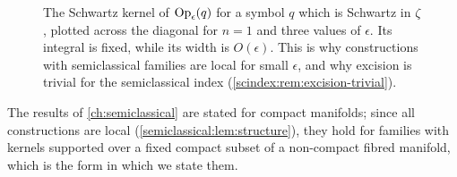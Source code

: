 \begin{figure}[ht]
\centering
{}
\caption[Concentration of semiclassical kernels]{The Schwartz kernel of
$\operatorname{Op}_\epsilon(q)$ for a symbol $q$ which is Schwartz in $\zeta$, plotted across the
diagonal for $n=1$ and three values of $\epsilon$. Its integral is fixed, while its
width is $O(\epsilon)$. This is why constructions with semiclassical families are
local for small $\epsilon$, and why excision is trivial for the semiclassical
index (\cref{scindex:rem:excision-trivial}).}
\label{scindex:fig:kernel}
\end{figure} The results of \cref{ch:semiclassical} are stated for compact
manifolds; since all constructions are local
(\cref{semiclassical:lem:structure}), they hold for families with kernels
supported over a fixed compact subset of a non-compact fibred manifold, which is
the form in which we state them.


